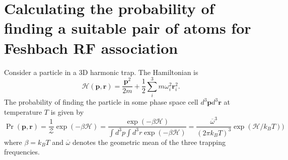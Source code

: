 \documentclass{article}
\theoremstyle{definition}
\newcommand{\ham}{\mathcal{H}}
\newcommand{\be}{\beta}
\newcommand{\f}[2]{\frac{#1}{#2}}
\newcommand{\lp}{\left(}
\newcommand{\rp}{\right)}
\begin{document}
\section{Calculating the probability of finding a suitable pair of atoms for Feshbach RF association}

Consider a particle in a 3D harmonic trap. The Hamiltonian is 
\begin{equation}
\ham(\mathbf{p}, \mathbf{r}) = \f{\mathbf{p}^2}{2m} + \f{1}{2} \sum_i^3 m\omega_i^2 \mathbf{r}_i^2.
\end{equation}
The probability of finding the particle in some phase space cell $d^3\mathbf{p} d^3 \mathbf{r}$ at temperature $T$ is given by 
\begin{equation}
\Pr(\mathbf{p}, \mathbf{r}) = \frac{1}{\mathcal{Z}} \exp\lp -\be\ham \rp = \f{\exp(-\be \ham)}{\int d^3 p \int d^3 r \exp (-\be \ham) } = \f{\overline{\omega}^3}{(2\pi k_BT)^3} \exp(\ham / k_BT))
\end{equation}
where $\be = k_BT$ and $\overline{\omega}$ denotes the geometric mean of the three trapping frequencies. \\
\end{document}

